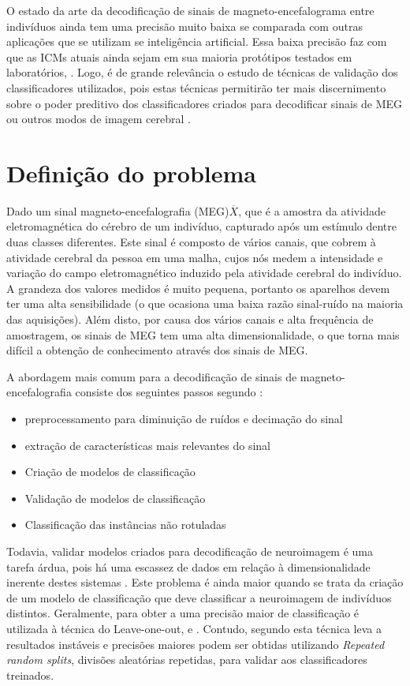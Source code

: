 O estado da arte da decodificação de sinais de magneto-encefalograma entre indivíduos ainda tem uma precisão muito baixa se comparada com outras aplicações que se utilizam se inteligência artificial. Essa baixa precisão faz com que as ICMs atuais ainda sejam em sua maioria protótipos testados em laboratórios, \cite{clerc2016brain2}. Logo, é de grande relevância o estudo de técnicas de validação dos classificadores utilizados, pois estas técnicas permitirão ter mais discernimento sobre o poder preditivo dos classificadores criados para decodificar sinais de MEG ou outros modos de imagem cerebral \cite{varoquaux2017assessing}.


\section{Definição do problema}

Dado um sinal magneto-encefalografia (MEG)$\overline{X}$, que é a amostra da atividade eletromagnética do cérebro de um indivíduo, capturado após um estímulo dentre duas classes diferentes. Este sinal é composto de vários canais, que cobrem à atividade cerebral da pessoa em uma malha, cujos nós medem a intensidade e variação do campo eletromagnético induzido pela atividade cerebral do indivíduo. A grandeza dos valores medidos é muito pequena, portanto os aparelhos devem ter uma alta sensibilidade (o que ocasiona uma baixa razão sinal-ruído na maioria das aquisições). Além disto, por causa dos vários canais e alta frequência de amostragem, os sinais de MEG tem uma alta dimensionalidade, o que torna mais difícil a obtenção de conhecimento através dos sinais de MEG.

A abordagem mais comum para a decodificação de sinais de magneto-encefalografia consiste dos seguintes passos segundo \cite{nam2018brain}:
\begin{itemize}
    \item preprocessamento para diminuição de ruídos e decimação do sinal
    \item extração de características mais relevantes do sinal
    \item Criação de modelos de classificação
    \item Validação de modelos de classificação
    \item Classificação das instâncias não rotuladas
\end{itemize}

Todavia, validar modelos criados para decodificação de neuroimagem é uma tarefa árdua, pois há uma escassez de dados em relação à dimensionalidade inerente destes sistemas \cite{carroll2009prediction}. Este problema é ainda maior quando se trata da criação de um modelo de classificação que deve classificar a neuroimagem de indivíduos distintos. Geralmente, para obter a uma precisão maior de classificação é utilizada à técnica do Leave-one-out, \cite{Barachant} e \cite{olivetti2014meg}. Contudo, segundo \cite{varoquaux2017assessing} esta técnica leva a resultados instáveis e precisões maiores podem ser obtidas utilizando \textit{Repeated random splits}, divisões aleatórias repetidas, para validar aos classificadores treinados. 

